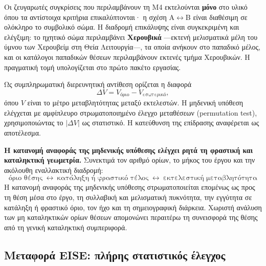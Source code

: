 \documentclass[11pt,a4paper]{article}
\begin{document}
Οι ζευγαρωτές συγκρίσεις που περιλαμβάνουν τη M4 εκτελούνται \textbf{μόνο} στο υλικό όπου τα αντίστοιχα κριτήρια επικαλύπτονται· η σχέση Α\(\leftrightarrow\)Β είναι διαθέσιμη σε ολόκληρο το συμβολικό σώμα. Η διαδρομή επικάλυψης είναι συγκεκριμένη και ελέγξιμη: το ηχητικό σώμα περιλαμβάνει \textbf{Χερουβικά} ---εκτενή μελισματικά μέλη του ύμνου των Χερουβείμ στη Θεία Λειτουργία---, τα οποία ανήκουν στο παπαδικό μέλος, και οι κατάλογοι παπαδικών θέσεων περιλαμβάνουν εκτενές τμήμα Χερουβικών. Η πραγματική τομή υπολογίζεται στο πρώτο πακέτο εργασίας.

Ως συμπληρωματική διερευνητική αντίθεση ορίζεται η διαφορά
\[
\Delta V=V_{\text{όριο}}-V_{\text{εσωτερικό}},
\]
όπου \(V\) είναι το μέτρο μεταβλητότητας μεταξύ εκτελεστών. Η μηδενική υπόθεση ελέγχεται με αμφίπλευρο στρωματοποιημένο έλεγχο μεταθέσεων (permutation test), χρησιμοποιώντας το \(|\Delta V|\) ως στατιστικό. Η κατεύθυνση της επίδρασης αναφέρεται ως αποτέλεσμα.

\textbf{Η κατανομή αναφοράς της μηδενικής υπόθεσης ελέγχει ρητά τη φραστική και καταληκτική γεωμετρία.} Συνεκτιμά τον αριθμό ορίων, το μήκος του έργου και την ακόλουθη εναλλακτική διαδρομή:
\[
\text{όριο θέσης}\ \leftrightarrow\ \text{κατάληξη ή φραστικό τέλος}\ \leftrightarrow\ \text{εκτελεστική μεταβλητότητα}
\]
Η κατανομή αναφοράς της μηδενικής υπόθεσης στρωματοποιείται επομένως ως προς τη θέση μέσα στο έργο, τη συλλαβική και μελισματική πυκνότητα, την εγγύτητα σε κατάληξη ή φραστικό όριο, τον ήχο και τη σημειογραφική διάρκεια. Χωριστή ανάλυση των μη καταληκτικών ορίων θέσεων απομονώνει περαιτέρω τη συνεισφορά της θέσης από τη γενική καταληκτική συμπεριφορά.

\subsection{Μεταφορά EISE: πλήρης στατιστικός έλεγχος}\label{app:stats-eise-transfer}
\end{document}
